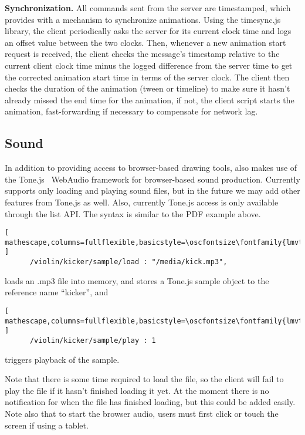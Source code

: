 \medskip
\noindent
\textbf{Synchronization.} 
All commands sent from the server are timestamped, which provides \drawsocket with a mechanism to synchronize animations.
Using the timesync.js library, the client periodically asks the server for its current clock time and logs an offset value between the two clocks.
Then, whenever a new animation start request is received, the client checks the message's timestamp relative to the current client clock time minus the logged difference from the server time to get the corrected animation start time in terms of the server clock.
The client then checks the duration of the animation (tween or timeline) to make sure it hasn't already missed the end time for the animation, if not, the client script starts the animation, fast-forwarding if necessary to compensate for network lag.


\subsection{Sound}\label{sec:sound}
In addition to providing access to browser-based drawing tools, \drawsocket also makes use of the Tone.js~\cite{mann2015interactive} WebAudio framework for browser-based sound production.
Currently \drawsocket supports only loading and playing sound files, but in the future we may add other features from Tone.js as well.
Also, currently Tone.js access is only available through the list API. 
The syntax is similar to the PDF example above. 


\begin{lstlisting}[ mathescape,columns=fullflexible,basicstyle=\oscfontsize\fontfamily{lmvtt}\selectfont ]
      /violin/kicker/sample/load : "/media/kick.mp3",
\end{lstlisting}
\noindent
loads an .mp3 file into memory, and stores a Tone.js sample object to the reference name ``kicker'', and

\begin{lstlisting}[ mathescape,columns=fullflexible,basicstyle=\oscfontsize\fontfamily{lmvtt}\selectfont ]
      /violin/kicker/sample/play : 1
\end{lstlisting}
\noindent
triggers playback of the sample.

Note that there is some time required to load the file, so the client will fail to play the file if it hasn't finished loading it yet. At the moment there is no notification for when the file has finished loading, but this could be added easily.
Note also that to start the browser audio, users must first click or touch the screen if using a tablet.

